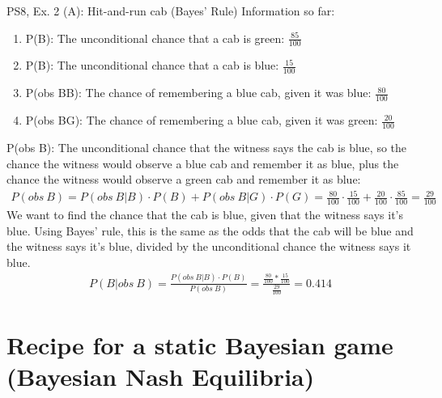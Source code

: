 \begin{frame}{PS8, Ex. 2 (A): Hit-and-run cab (Bayes' Rule)}
    Information so far:
    \begin{enumerate}
        \item P(B): The unconditional chance that a cab is green: $\frac{85}{100}$
        \item P(B): The unconditional chance that a cab is blue: $\frac{15}{100}$
        \item P(obs B\textbar B): The chance of remembering a blue cab, given it was blue: $\frac{80}{100}$
        \item P(obs B\textbar G): The chance of remembering a blue cab, given it was green: $\frac{20}{100}$
    \end{enumerate}
    P(obs B): The unconditional chance that the witness says the cab is blue, so the chance the witness would observe a blue cab and remember it as blue, plus the chance the witness would observe a green cab and remember it as blue:
    \begin{align*}
        P(obs\ B)=P(obs\ B|B)\cdot P(B)+P(obs\ B|G)\cdot P(G)=\frac{80}{100}\cdot\frac{15}{100}+\frac{20}{100}\cdot\frac{85}{100}=\frac{29}{100}
    \end{align*}
    We want to find the chance that the cab is blue, given that the witness says it's blue. Using Bayes' rule, this is the same as the odds that the cab will be blue and the witness says it's blue, divided by the unconditional chance the witness says it blue.
    \begin{align*}
        P(B|obs\ B)=\frac{P(obs\ B|B)\cdot P(B)}{P(obs\ B)}=\frac{\frac{80}{100}*\frac{15}{100}}{\frac{29}{100}}=0.414
    \end{align*}
    \vfill\null
\end{frame}



\section{Recipe for a static Bayesian game (Bayesian Nash Equilibria)}

